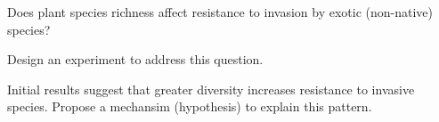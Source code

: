 \begin{frame}[t]
    \begin{adjustwidth}{-2em}{-1.5em}
        Does plant species richness affect resistance to invasion
        by exotic (non-native) species?

        \vspace{18mm}
        Design an experiment to address this question.

        \vspace{18mm}
        Initial results suggest that greater diversity increases resistance to
        invasive species. Propose a mechansim (hypothesis) to explain this
        pattern.

    \end{adjustwidth}
\end{frame}




\clickerslide{
\begin{frame}
    \begin{clickerquestion}
        \item 
        \begin{clickeroptions}
            \item 
            \item 
            \item 
            \item 
        \end{clickeroptions}
    \end{clickerquestion}
\end{frame}
}


